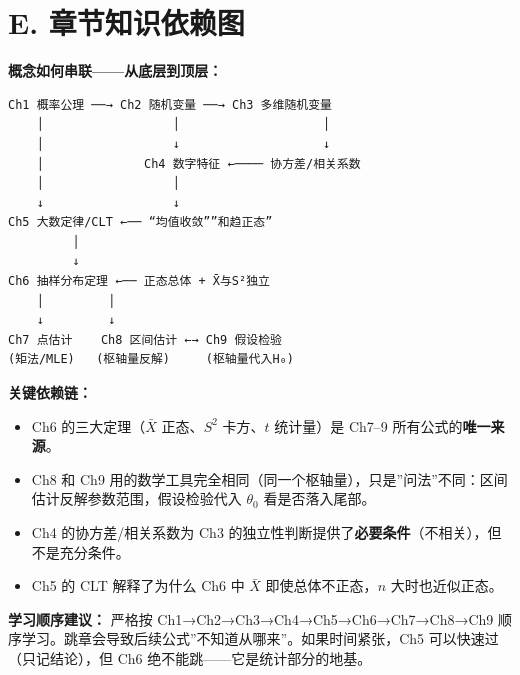 ﻿\documentclass[lang=cn,11pt]{elegantbook}
\begin{document}
\section*{E. 章节知识依赖图}

\begin{note}
\textbf{概念如何串联——从底层到顶层：}

\begin{verbatim}
Ch1 概率公理 ──→ Ch2 随机变量 ──→ Ch3 多维随机变量
    │                  │                    │
    │                  ↓                    ↓
    │              Ch4 数字特征 ←──── 协方差/相关系数
    │                  │
    ↓                  ↓
Ch5 大数定律/CLT ←── “均值收敛””和趋正态”
         │
         ↓
Ch6 抽样分布定理 ←── 正态总体 + X̄与S²独立
    │         │
    ↓         ↓
Ch7 点估计    Ch8 区间估计 ←→ Ch9 假设检验
(矩法/MLE)   (枢轴量反解)     (枢轴量代入H₀)
\end{verbatim}

\textbf{关键依赖链：}
\begin{itemize}
    \item Ch6 的三大定理（$\bar X$ 正态、$S^2$ 卡方、$t$ 统计量）是 Ch7--9 所有公式的\textbf{唯一来源}。
    \item Ch8 和 Ch9 用的数学工具完全相同（同一个枢轴量），只是”问法”不同：区间估计反解参数范围，假设检验代入 $\theta_0$ 看是否落入尾部。
    \item Ch4 的协方差/相关系数为 Ch3 的独立性判断提供了\textbf{必要条件}（不相关），但不是充分条件。
    \item Ch5 的 CLT 解释了为什么 Ch6 中 $\bar X$ 即使总体不正态，$n$ 大时也近似正态。
\end{itemize}

\textbf{学习顺序建议：} 严格按 Ch1→Ch2→Ch3→Ch4→Ch5→Ch6→Ch7→Ch8→Ch9 顺序学习。跳章会导致后续公式”不知道从哪来”。如果时间紧张，Ch5 可以快速过（只记结论），但 Ch6 绝不能跳——它是统计部分的地基。
\end{note}
\end{document}
